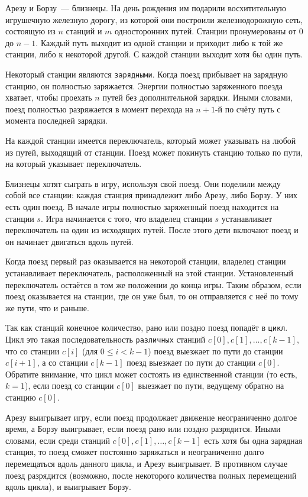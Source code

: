 Арезу и Борзу~--- близнецы. На день рождения им подарили восхитительную игрушечную
железную дорогу, из которой они построили железнодорожную сеть, состоящую из $n$ станций и $m$ односторонних путей. Станции пронумерованы от $0$ до $n - 1$. Каждый путь выходит из
одной станции и приходит либо к той же станции, либо к некоторой другой. С каждой станции
выходит хотя бы один путь.

Некоторый станции являются \texttt{зарядными}. Когда поезд прибывает на зарядную станцию, он полностью заряжается. Энергии полностью заряженного поезда хватает, чтобы проехать $n$
путей без дополнительной зарядки. Иными словами, поезд полностью разряжается в момент
перехода на $n + 1$-й по счёту путь с момента последней зарядки.

На каждой станции имеется переключатель, который может указывать на любой из путей,
выходящий от станции. Поезд может покинуть станцию только по пути, на который указывает
переключатель.

Близнецы хотят сыграть в игру, используя свой поезд. Они поделили между собой все станции:
каждая станция принадлежит либо Арезу, либо Борзу. У них есть один поезд. В начале игры
полностью заряженный поезд находится на станции $s$. Игра начинается с того, что владелец
станции $s$ устанавливает переключатель на один из исходящих путей. После этого дети
включают поезд и он начинает двигаться вдоль путей.

Когда поезд первый раз оказывается на некоторой станции, владелец станции устанавливает
переключатель, расположенный на этой станции. Установленный переключатель остаётся в
том же положении до конца игры. Таким образом, если поезд оказывается на станции, где он
уже был, то он отправляется с неё по тому же пути, что и раньше.

Так как станций конечное количество, рано или поздно поезд попадёт в \texttt{цикл}. Цикл это такая последовательность \texttt{различных} станций $c[0], c[1], \ldots, c[k - 1]$, что со станции $c[i]$ (для $0 \le i < k - 1$) поезд выезжает по пути до станции $c[i + 1]$, а со станции $c[k - 1]$ поезд выезжает по пути до станции $c[0]$. Обратите внимание, что цикл может состоять из единственной станции (то есть, $k = 1$), если поезд со станции $c[0]$ выезжает по пути, ведущему обратно на станцию $c[0]$.

Арезу выигрывает игру, если поезд продолжает движение неограниченно долгое время, а
Борзу выигрывает, если поезд рано или поздно разрядится. Иными словами, если среди
станций $c[0], c[1], \ldots, c[k - 1]$ есть хотя бы одна зарядная станция, то поезд сможет постоянно заряжаться и неограниченно долго перемещаться вдоль данного цикла, и Арезу выигрывает. В противном случае поезд разрядится (возможно, после некоторого количества полных перемещений вдоль цикла), и выигрывает Борзу.

